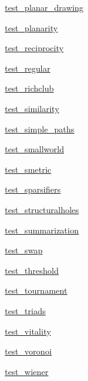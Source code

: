 \begin{DoxyCompactItemize}
\item 
 \hyperlink{namespacenetworkx_1_1algorithms_1_1tests_1_1test__planar__drawing}{test\+\_\+planar\+\_\+drawing}
\item 
 \hyperlink{namespacenetworkx_1_1algorithms_1_1tests_1_1test__planarity}{test\+\_\+planarity}
\item 
 \hyperlink{namespacenetworkx_1_1algorithms_1_1tests_1_1test__reciprocity}{test\+\_\+reciprocity}
\item 
 \hyperlink{namespacenetworkx_1_1algorithms_1_1tests_1_1test__regular}{test\+\_\+regular}
\item 
 \hyperlink{namespacenetworkx_1_1algorithms_1_1tests_1_1test__richclub}{test\+\_\+richclub}
\item 
 \hyperlink{namespacenetworkx_1_1algorithms_1_1tests_1_1test__similarity}{test\+\_\+similarity}
\item 
 \hyperlink{namespacenetworkx_1_1algorithms_1_1tests_1_1test__simple__paths}{test\+\_\+simple\+\_\+paths}
\item 
 \hyperlink{namespacenetworkx_1_1algorithms_1_1tests_1_1test__smallworld}{test\+\_\+smallworld}
\item 
 \hyperlink{namespacenetworkx_1_1algorithms_1_1tests_1_1test__smetric}{test\+\_\+smetric}
\item 
 \hyperlink{namespacenetworkx_1_1algorithms_1_1tests_1_1test__sparsifiers}{test\+\_\+sparsifiers}
\item 
 \hyperlink{namespacenetworkx_1_1algorithms_1_1tests_1_1test__structuralholes}{test\+\_\+structuralholes}
\item 
 \hyperlink{namespacenetworkx_1_1algorithms_1_1tests_1_1test__summarization}{test\+\_\+summarization}
\item 
 \hyperlink{namespacenetworkx_1_1algorithms_1_1tests_1_1test__swap}{test\+\_\+swap}
\item 
 \hyperlink{namespacenetworkx_1_1algorithms_1_1tests_1_1test__threshold}{test\+\_\+threshold}
\item 
 \hyperlink{namespacenetworkx_1_1algorithms_1_1tests_1_1test__tournament}{test\+\_\+tournament}
\item 
 \hyperlink{namespacenetworkx_1_1algorithms_1_1tests_1_1test__triads}{test\+\_\+triads}
\item 
 \hyperlink{namespacenetworkx_1_1algorithms_1_1tests_1_1test__vitality}{test\+\_\+vitality}
\item 
 \hyperlink{namespacenetworkx_1_1algorithms_1_1tests_1_1test__voronoi}{test\+\_\+voronoi}
\item 
 \hyperlink{namespacenetworkx_1_1algorithms_1_1tests_1_1test__wiener}{test\+\_\+wiener}
\end{DoxyCompactItemize}
